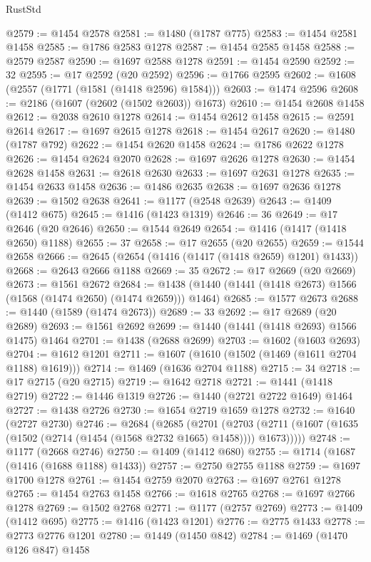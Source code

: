 \begin{lexlean}{RustStd}
\begin{coremodule}
@2579 := @1454 @2578
@2581 := @1480 (@1787 @775)
@2583 := @1454 @2581 @1458
@2585 := @1786 @2583 @1278
@2587 := @1454 @2585 @1458
@2588 := @2579 @2587
@2590 := @1697 @2588 @1278
@2591 := @1454 @2590
@2592 := 32
@2595 := @17 @2592 (@20 @2592)
@2596 := @1766 @2595
@2602 := @1608 (@2557 (@1771 (@1581 (@1418 @2596) @1584)))
@2603 := @1474 @2596
@2608 := @2186 (@1607 (@2602 (@1502 @2603)) @1673)
@2610 := @1454 @2608 @1458
@2612 := @2038 @2610 @1278
@2614 := @1454 @2612 @1458
@2615 := @2591 @2614
@2617 := @1697 @2615 @1278
@2618 := @1454 @2617
@2620 := @1480 (@1787 @792)
@2622 := @1454 @2620 @1458
@2624 := @1786 @2622 @1278
@2626 := @1454 @2624 @2070
@2628 := @1697 @2626 @1278
@2630 := @1454 @2628 @1458
@2631 := @2618 @2630
@2633 := @1697 @2631 @1278
@2635 := @1454 @2633 @1458
@2636 := @1486 @2635
@2638 := @1697 @2636 @1278
@2639 := @1502 @2638
@2641 := @1177 (@2548 @2639)
@2643 := @1409 (@1412 @675)
@2645 := @1416 (@1423 @1319)
@2646 := 36
@2649 := @17 @2646 (@20 @2646)
@2650 := @1544 @2649
@2654 := @1416 (@1417 (@1418 @2650) @1188)
@2655 := 37
@2658 := @17 @2655 (@20 @2655)
@2659 := @1544 @2658
@2666 := @2645 (@2654 (@1416 (@1417 (@1418 @2659) @1201) @1433))
@2668 := @2643 @2666 @1188
@2669 := 35
@2672 := @17 @2669 (@20 @2669)
@2673 := @1561 @2672
@2684 := @1438 (@1440 (@1441 (@1418 @2673) @1566 (@1568 (@1474 @2650) (@1474 @2659))) @1464)
@2685 := @1577 @2673
@2688 := @1440 (@1589 (@1474 @2673))
@2689 := 33
@2692 := @17 @2689 (@20 @2689)
@2693 := @1561 @2692
@2699 := @1440 (@1441 (@1418 @2693) @1566 @1475) @1464
@2701 := @1438 (@2688 @2699)
@2703 := @1602 (@1603 @2693)
@2704 := @1612 @1201
@2711 := @1607 (@1610 (@1502 (@1469 (@1611 @2704 @1188) @1619)))
@2714 := @1469 (@1636 @2704 @1188)
@2715 := 34
@2718 := @17 @2715 (@20 @2715)
@2719 := @1642 @2718
@2721 := @1441 (@1418 @2719)
@2722 := @1446 @1319
@2726 := @1440 (@2721 @2722 @1649) @1464
@2727 := @1438 @2726
@2730 := @1654 @2719 @1659 @1278
@2732 := @1640 (@2727 @2730)
@2746 := @2684
    (@2685
      (@2701
        (@2703 (@2711 (@1607 (@1635 (@1502 (@2714 (@1454 (@1568 @2732 @1665) @1458)))) @1673)))))
@2748 := @1177 (@2668 @2746)
@2750 := @1409 (@1412 @680)
@2755 := @1714 (@1687 (@1416 (@1688 @1188) @1433))
@2757 := @2750 @2755 @1188
@2759 := @1697 @1700 @1278
@2761 := @1454 @2759 @2070
@2763 := @1697 @2761 @1278
@2765 := @1454 @2763 @1458
@2766 := @1618 @2765
@2768 := @1697 @2766 @1278
@2769 := @1502 @2768
@2771 := @1177 (@2757 @2769)
@2773 := @1409 (@1412 @695)
@2775 := @1416 (@1423 @1201)
@2776 := @2775 @1433
@2778 := @2773 @2776 @1201
@2780 := @1449 (@1450 @842)
@2784 := @1469 (@1470 @126 @847) @1458

\end{coremodule}
\end{lexlean}
